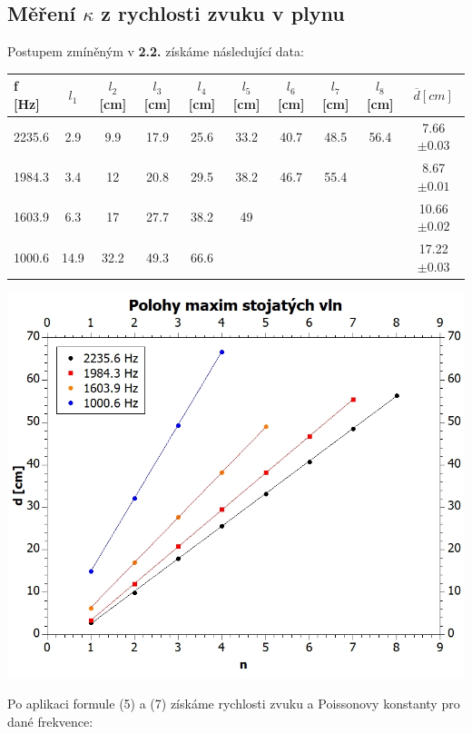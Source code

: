 \documentclass[czech,11pt,a4paper]{article}
\begin{document}
	\subsection{Měření $\kappa$ z rychlosti zvuku v plynu}
	Postupem zmíněným v \textbf{2.2.} získáme následující data:
	
\begin{center}
		\begin{tabular}{|l|c|c|c|c|c|c|c|c||c|}
		\hline
		f [Hz]  & $l_1$ & $l_2$ [cm] & $l_3$ [cm] & $l_4$ [cm] & $l_5$ [cm] & $l_6$ [cm] & $l_7$ [cm] & $l_8$ [cm] & $\overline{d} [cm]$ \\ \hline
		2235.6   & 2.9   & 9.9        & 17.9       & 25.6       & 33.2       & 40.7       & 48.5       & 56.4       &7.66 $ \pm 0.03$\\ \hline
		1984.3   & 3.4   & 12         & 20.8       & 29.5       & 38.2       & 46.7       & 55.4       &            &8.67 $\pm 0.01$\\ \hline
		1603.9 & 6.3   & 17         & 27.7       & 38.2       & 49         &            &            &            &10.66 $\pm 0.02$\\ \hline
		1000.6 & 14.9  & 32.2       & 49.3       & 66.6       &            &            &            &            &17.22 $\pm 0.03$\\ \hline
	\end{tabular}
	
	\includegraphics[width=0.6\linewidth, ]{max} 
	
\end{center}

Po aplikaci formule (5) a (7) získáme rychlosti zvuku a Poissonovy konstanty pro dané frekvence:
\end{document}
